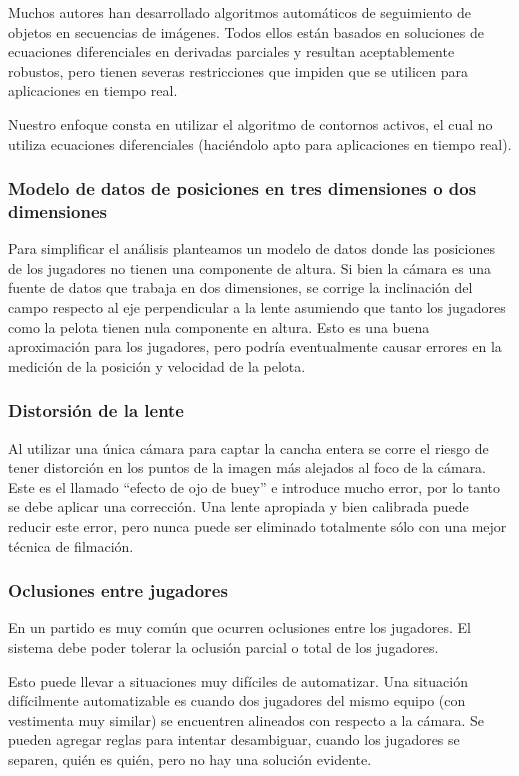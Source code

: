 \documentclass[a4paper,10pt]{article}
\begin{document}
Muchos autores han desarrollado algoritmos automáticos de seguimiento de
objetos en secuencias de imágenes. Todos ellos están basados en soluciones de
ecuaciones diferenciales en derivadas parciales y resultan aceptablemente
robustos, pero tienen severas restricciones que impiden que se utilicen para
aplicaciones en tiempo real.

Nuestro enfoque consta en utilizar el algoritmo de contornos activos,
el cual no utiliza ecuaciones diferenciales (haciéndolo apto para
aplicaciones en tiempo real).

\subsubsection{Modelo de datos de posiciones en tres dimensiones o dos
dimensiones}

Para simplificar el análisis planteamos un modelo de datos donde las posiciones
de los jugadores no tienen una componente de altura. Si bien la cámara es una
fuente de datos que trabaja en dos dimensiones, se corrige la inclinación del
campo respecto al eje perpendicular a la lente asumiendo que tanto los
jugadores como la pelota tienen nula componente en altura. Esto es una buena
aproximación para los jugadores, pero podría eventualmente causar errores en la
medición de la posición y velocidad de la pelota.

\subsubsection{Distorsión de la lente}

Al utilizar una única cámara para captar la cancha entera se corre el riesgo de
tener distorción en los puntos de la imagen más alejados al foco de la cámara.
Este es el llamado ``efecto de ojo de buey'' e introduce mucho error, por lo
tanto se debe aplicar una corrección. Una lente apropiada y bien calibrada
puede reducir este error, pero nunca puede ser eliminado totalmente sólo con
una mejor técnica de filmación.

\subsubsection{Oclusiones entre jugadores}

En un partido es muy común que ocurren oclusiones entre los jugadores. El
sistema debe poder tolerar la oclusión parcial o total de los jugadores.

Esto puede llevar a situaciones muy difíciles de automatizar. Una situación
difícilmente automatizable es cuando dos jugadores del mismo equipo (con
vestimenta muy similar) se encuentren alineados con respecto a la cámara.
Se pueden agregar reglas para intentar desambiguar, cuando los jugadores se
separen, quién es quién, pero no hay una solución evidente.
\end{document}
